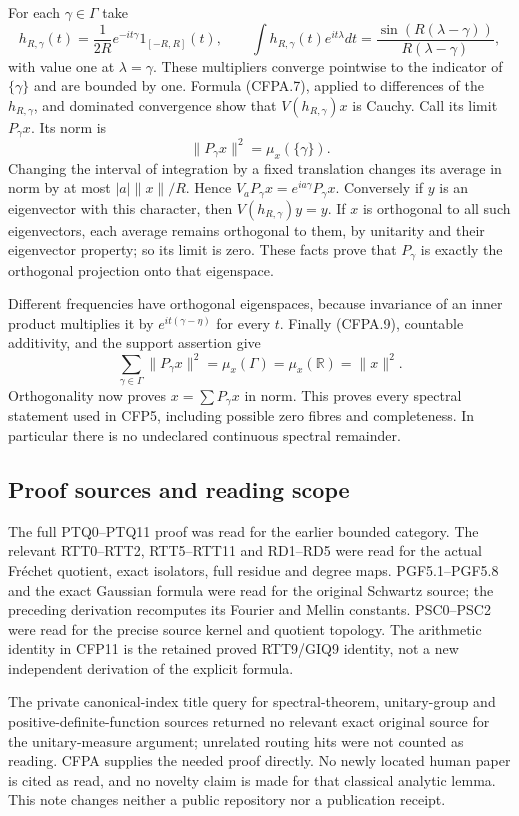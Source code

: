 For each \(\gamma\in\Gamma\) take \[
h_{R,\gamma}(t)=\frac1{2R}e^{-it\gamma}1_{[-R,R]}(t),
\qquad
\int h_{R,\gamma}(t)e^{it\lambda}dt
=\frac{\sin(R(\lambda-\gamma))}{R(\lambda-\gamma)},
\tag{CFPA.8}
\] with value one at \(\lambda=\gamma\). These multipliers converge
pointwise to the indicator of \(\{\gamma\}\) and are bounded by one.
Formula (CFPA.7), applied to differences of the \(h_{R,\gamma}\), and
dominated convergence show that \(V(h_{R,\gamma})x\) is Cauchy. Call its
limit \(P_\gamma x\). Its norm is \[
\|P_\gamma x\|^2=\mu_x(\{\gamma\}).
\tag{CFPA.9}
\] Changing the interval of integration by a fixed translation changes
its average in norm by at most \(|a|\|x\|/R\). Hence
\(V_aP_\gamma x=e^{ia\gamma}P_\gamma x\). Conversely if \(y\) is an
eigenvector with this character, then \(V(h_{R,\gamma})y=y\). If \(x\)
is orthogonal to all such eigenvectors, each average remains orthogonal
to them, by unitarity and their eigenvector property; so its limit is
zero. These facts prove that \(P_\gamma\) is exactly the orthogonal
projection onto that eigenspace.

Different frequencies have orthogonal eigenspaces, because invariance of
an inner product multiplies it by \(e^{it(\gamma-\eta)}\) for every
\(t\). Finally (CFPA.9), countable additivity, and the support assertion
give \[
\sum_{\gamma\in\Gamma}\|P_\gamma x\|^2
=\mu_x(\Gamma)=\mu_x(\mathbb R)=\|x\|^2.
\tag{CFPA.10}
\] Orthogonality now proves \(x=\sum P_\gamma x\) in norm. This proves
every spectral statement used in CFP5, including possible zero fibres
and completeness. In particular there is no undeclared continuous
spectral remainder.

\subsection{Proof sources and reading
scope}\label{proof-sources-and-reading-scope}

The full PTQ0--PTQ11 proof was read for the earlier bounded category.
The relevant RTT0--RTT2, RTT5--RTT11 and RD1--RD5 were read for the
actual Fréchet quotient, exact isolators, full residue and degree maps.
PGF5.1--PGF5.8 and the exact Gaussian formula were read for the original
Schwartz source; the preceding derivation recomputes its Fourier and
Mellin constants. PSC0--PSC2 were read for the precise source kernel and
quotient topology. The arithmetic identity in CFP11 is the retained
proved RTT9/GIQ9 identity, not a new independent derivation of the
explicit formula.

The private canonical-index title query for spectral-theorem,
unitary-group and positive-definite-function sources returned no
relevant exact original source for the unitary-measure argument;
unrelated routing hits were not counted as reading. CFPA supplies the
needed proof directly. No newly located human paper is cited as read,
and no novelty claim is made for that classical analytic lemma. This
note changes neither a public repository nor a publication receipt.
